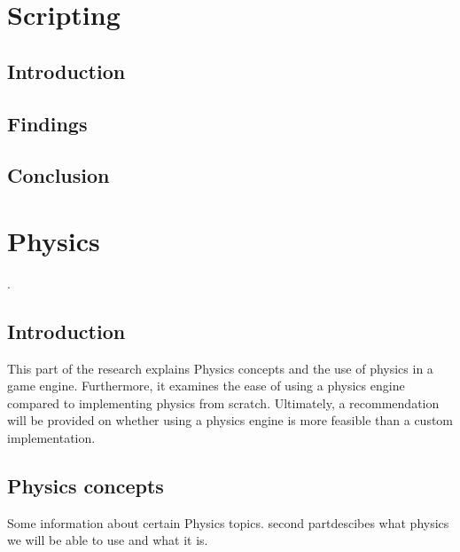\documentclass{projdoc}
\begin{document}
\section{Scripting}

\subsection{Introduction}

\subsection{Findings}

\subsection{Conclusion}

\section{Physics}

.

\subsection{Introduction}
This part of the research explains Physics concepts and the use of physics in a game engine. Furthermore, it examines the ease of using a physics engine compared to implementing physics from scratch. Ultimately, a recommendation will be provided on whether using a physics engine is more feasible than a custom implementation.


\subsection{Physics concepts}

Some information about certain Physics topics. second partdescibes what physics we will be able to use and what it is.
\end{document}
